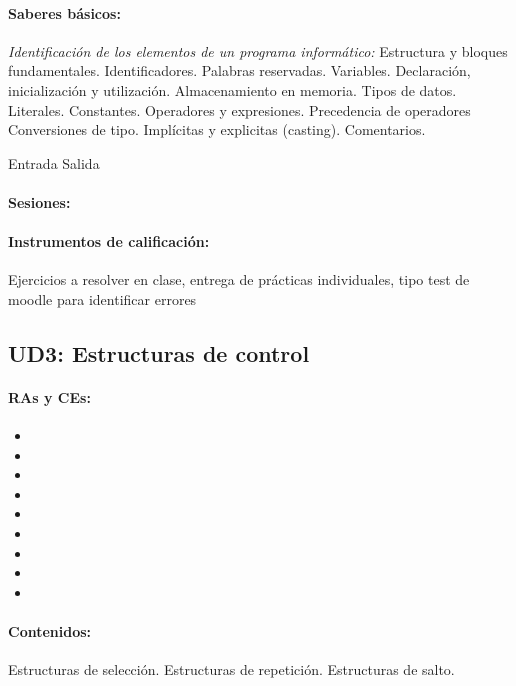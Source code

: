 	\paragraph{Saberes básicos:} \emph{Identificación de los elementos de un programa informático:}
		Estructura y bloques fundamentales.
		Identificadores.
		Palabras reservadas.
		Variables. Declaración, inicialización y utilización. Almacenamiento en memoria.
		Tipos de datos.
		Literales.
		Constantes.
		Operadores y expresiones. Precedencia de operadores
		Conversiones de tipo. Implícitas y explicitas (casting).
		Comentarios.

		Entrada Salida


	\paragraph{Sesiones:} 

	\paragraph{Instrumentos de calificación: } Ejercicios a resolver en clase, entrega de prácticas individuales, tipo test de moodle para identificar errores

\newpage
\subsection{UD3: Estructuras de control}

	\paragraph{RAs y CEs:}
	\begin{itemize}[itemsep=0.1em, topsep=0.1em]
		\item\RATRESa
		\item\RATRESb
		\item\RATRESc
		\item\RATRESe
		\item\RATRESf
		\item\RATRESg		
		\item\RACINCOa
		\item\RACINCOb
		\item\RACINCOc	
	\end{itemize}

	\paragraph{Contenidos:}
		Estructuras de selección.
		Estructuras de repetición.
		Estructuras de salto.


